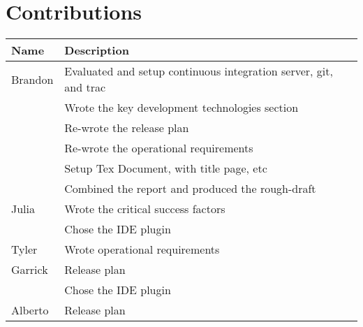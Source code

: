 \section{Contributions}
\begin{tabular}{| l | l |}
\hline
Name & Description \\
\hline
Brandon & Evaluated and setup continuous integration server, git, and trac\\
 & Wrote the key development technologies section \\
 & Re-wrote the release plan \\
 & Re-wrote the operational requirements \\
 & Setup Tex Document, with title page, etc \\
 & Combined the report and produced the rough-draft \\
\hline
Julia & Wrote the critical success factors \\
 & Chose the IDE plugin \\
\hline
Tyler & Wrote operational requirements \\
\hline
Garrick & Release plan \\
 & Chose the IDE plugin \\
\hline
Alberto & Release plan \\
\hline
\end{tabular}
